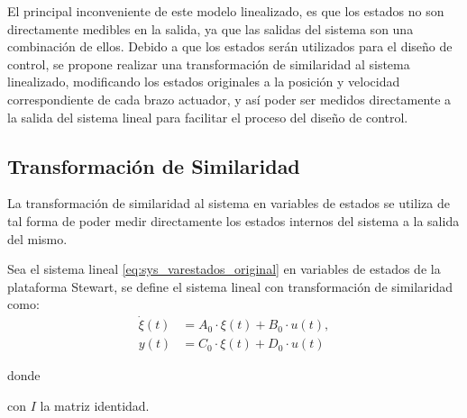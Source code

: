 El principal inconveniente de este modelo linealizado, es que los estados no son directamente medibles en la salida, ya que las salidas del sistema son una combinación de ellos. Debido a que los estados serán utilizados para el diseño de control, se propone realizar una transformación de similaridad al sistema linealizado, modificando los estados originales a la posición y velocidad correspondiente de cada brazo actuador, y así poder ser medidos directamente a la salida del sistema lineal para facilitar el proceso del diseño de control.


\subsection{Transformación de Similaridad}

La transformación de similaridad al sistema en variables de estados se utiliza de tal forma de poder medir directamente los estados internos del sistema a la salida del mismo. 

\begin{mybox}{}
    \begin{lemma} \label{lem3:sys_transform}
        Sea el sistema lineal \ref{eq:sys_varestados_original} en variables de estados de la plataforma Stewart, se define el sistema lineal con transformación de similaridad como:
        \begin{subequations} \label{eq:sys_varestados_transf}
            \begin{align}
                \Dot{\xi}(t) & = A_0 \cdot \xi(t) + B_0 \cdot u(t), \\
                y(t) & = C_0 \cdot \xi(t) + D_0 \cdot u(t)
            \end{align}    
        \end{subequations}
        
        donde\\ 
        
        con $I$ la matriz identidad.
    \end{lemma}
\end{mybox}




